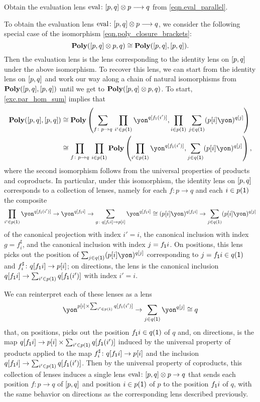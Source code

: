\documentclass[Book-Poly]{subfiles}
\begin{document}
\begin{exercise} \label{exc.eval_parallel}
Obtain the evaluation lens $\mathrm{eval}\colon [p,q]\otimes p\longrightarrow q$ from \eqref{eqn.eval_parallel}.
\begin{solution}
To obtain the evaluation lens $\mathrm{eval}\colon [p,q]\otimes p\longrightarrow q$, we consider the following special case of the isomorphism \eqref{eqn.poly_closure_brackets}:
\[
    \mathbf{Poly}([p,q] \otimes p, q) \cong \mathbf{Poly}([p,q], [p,q]).
\]
Then the evaluation lens is the lens corresponding to the identity lens on $[p,q]$ under the above isomorphism.
To recover this lens, we can start from the identity lens on $[p,q]$ and work our way along a chain of natural isomorphisms from $\mathbf{Poly}([p,q], [p,q])$ until we get to $\mathbf{Poly}([p,q] \otimes p, q)$.
To start, \cref{exc.par_hom_sum} implies that
\begin{align*}
    \poly(\ihom{p,q}, \ihom{p,q})
    &\iso
    \poly\left(\sum_{f \colon p \to q} \, \prod_{i' \in p(\1)} \yon^{q[f_\1(i')]}, \prod_{i \in p(\1)} \, \sum_{j \in q(\1)} (p[i]\yon)^{q[j]}\right) \\
    &\iso
    \prod_{f \colon p \to q} \, \prod_{i \in p(\1)} \poly\left(\prod_{i' \in p(\1)} \yon^{q[f_\1(i')]}, \sum_{j \in q(\1)} (p[i]\yon)^{q[j]}\right),
\end{align*}
where the second isomorphism follows from the universal properties of products and coproducts.
In particular, under this isomorphism, the identity lens on $[p,q]$ corresponds to a collection of lenses, namely for each $f \colon p \to q$ and each $i \in p(\textsf{1})$ the composite
\[
    \prod_{i' \in p(\1)} \yon^{q[f_\1(i')]} \to \yon^{q[f_\1i]} \to \sum_{g \colon q[f_\1i] \to p[i]} \yon^{q[f_\1i]} \iso (p[i]\yon)^{q[f_\1i]} \to \sum_{j \in q(\1)} (p[i]\yon)^{q[j]}
\]
of the canonical projection with index $i' = i$, the canonical inclusion with index $g = f^\sharp_i$, and the canonical inclusion with index $j = f_{\textsf{1}}i$.
On positions, this lens picks out the position of $\sum_{j \in q(\1)} (p[i]\yon)^{q[j]}$ corresponding to $j = f_{\textsf{1}}i \in q(\textsf{1})$ and $f^\sharp_i \colon q[f_{\textsf{1}}i] \to p[i]$; on directions, the lens is the canonical inclusion $q[f_{\textsf{1}}i] \to \sum_{i' \in p(\textsf{1})} q[f_{\textsf{1}}(i')]$ with index $i' = i$.

We can reinterpret each of these lenses as a lens
\[
    \yon^{p[i] \times \sum_{i' \in p(\1)} q[f_\1(i')]} \to \sum_{j \in q(\1)} \yon^{q[j]} \iso q
\]
that, on positions, picks out the position $f_{\textsf{1}}i \in q(\textsf{1})$ of $q$ and, on directions, is the map $q[f_{\textsf{1}}i] \to p[i] \times \sum_{i' \in p(\textsf{1})} q[f_{\textsf{1}}(i')]$ induced by the universal property of products applied to the map $f^\sharp_i \colon q[f_{\textsf{1}}i] \to p[i]$ and the inclusion $q[f_{\textsf{1}}i] \to \sum_{i' \in p(\textsf{1})} q[f_{\textsf{1}}(i')]$.
Then by the universal property of coproducts, this collection of lenses induces a single lens $\mathrm{eval} \colon [p, q] \otimes p \to q$ that sends each position $f \colon p \to q$ of $[p,q]$ and position $i \in p(\textsf{1})$ of $p$ to the position $f_{\textsf{1}}i$ of $q$, with the same behavior on directions as the corresponding lens described previously.
\end{solution}
\end{exercise}
\end{document}
